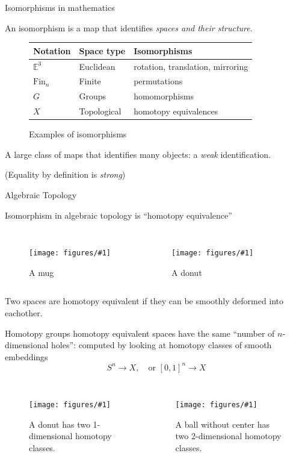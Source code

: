 \documentclass[english]{beamer}
\newcommand{\fig}[2]{
    \begin{figure}\begin{center}\texttt{[image: figures/\#1]}\caption{#2\label{#1}}\end{center}
    \end{figure}}
\newcommand{\tcol}[2]{
    \begin{columns}
        \column{.5\textwidth}
        #1
        \column{.5\textwidth}
        #2
    \end{columns}
}
\begin{document}
\begin{frame}{Isomorphisms in mathematics}
\begin{definition}
 An isomorphism is a map that identifies \emph{spaces and their structure}.
\end{definition}

\begin{figure}
\begin{centering}
\begin{table}[]
\begin{tabular}{lll}
\hline
Notation       & Space type         & Isomorphisms                          \\ \hline
$\mathbb{E}^3$ & Euclidean     & rotation, translation, mirroring      \\
$\text{Fin}_n$ & Finite        & permutations                          \\
$G$            & Groups             & homomorphisms                         \\ 
$X$            & Topological & homotopy equivalences
\end{tabular}
\end{table}
\caption{Examples of isomorphisms}
\end{centering}
\end{figure}

A large class of maps that identifies many objects: a \emph{weak} identification.


(Equality by definition is \emph{strong})

\end{frame}



\begin{frame}{Algebraic Topology}

Isomorphism in algebraic topology is ``homotopy equivalence''

\begin{columns}
    \fig{mug}{A mug}
    \fig{donut.jpg}{A donut}
\end{columns}

\begin{definition}
 Two spaces are homotopy equivalent if they can be smoothly deformed into eachother.
\end{definition}


\end{frame}


\begin{frame}{Homotopy groups}
homotopy equivalent spaces have the same ``number of \(n\)-dimensional holes'': 
computed by looking at homotopy classes of smooth embeddings \[S^n \rightarrow X, \quad \text{or } {[0,1]}^n \rightarrow X\]

\tcol{
                \fig{loops}{A donut has two 1-dimensional homotopy classes.}
}
    {
                \fig{basketball_hollow}{A ball without center has two 2-dimensional homotopy classes.}
}

\end{frame}
\end{document}
